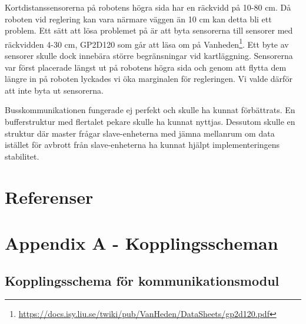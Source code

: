 \documentclass[a4paper,12pt,fleqn]{article}
\begin{document}
Kortdistanssensorerna på robotens högra sida har en räckvidd på 10-80 cm. Då roboten vid reglering kan vara närmare väggen än 10 cm kan detta bli ett problem. Ett sätt att lösa problemet på är att byta sensorerna till sensorer med räckvidden 4-30 cm, 
GP2D120 som går att läsa om på Vanheden\footnote{\url{https://docs.isy.liu.se/twiki/pub/VanHeden/DataSheets/gp2d120.pdf}}. Ett byte av sensorer skulle dock innebära större begränsningar vid kartläggning.
Sensorerna var först placerade längst ut på robotens högra sida och genom att flytta dem längre in på roboten lyckades vi öka marginalen för regleringen. Vi valde därför att inte byta ut sensorerna.

Busskommunikationen fungerade ej perfekt och skulle ha kunnat förbättrats. En bufferstruktur med flertalet pekare skulle ha kunnat nyttjas. Dessutom skulle en struktur där master frågar slave-enheterna med jämna mellanrum om data istället för avbrott från slave-enheterna ha kunnat hjälpt implementeringens stabilitet.
\newpage
\section*{Referenser}




\newpage
\appendix
\pagestyle{empty}
\section*{Appendix A - Kopplingsscheman}
\subsection*{Kopplingsschema för kommunikationsmodul}
\end{document}

